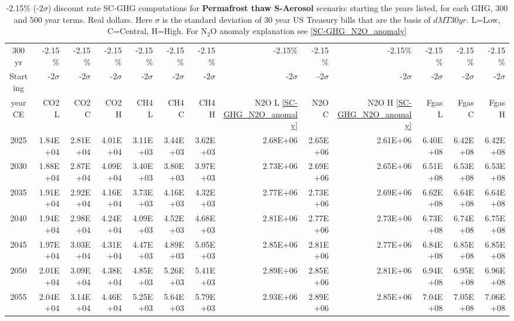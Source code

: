 \documentclass{article}
\begin{document}
\begin{table}
   \caption{-2.15\% (-2$\sigma$) discount rate   SC-GHG computations for \textbf{Permafrost thaw S-Aerosol} scenario: starting the years listed, for each GHG, 300 and 500 year terms. Real dollars. Here $\sigma$ is the standard deviation of 30 year US Treasury bills that are the basis of $dMT30yr$. L=Low, C=Central, H=High. For N$_2$O anomaly explanation see \ref{SC-GHG_N2O_anomaly}} 
\label{PVs_300_yearSCC_SH2.15}
\small
\begin{tabular}{crrr|rrr|rrr|rrr}
300 yr   & -2.15\%    & -2.15\%    & -2.15\%    & -2.15\%    & -2.15\%    & -2.15\%    & -2.15\%    & -2.15\%    & -2.15\%    & -2.15\%    & -2.15\%    & -2.15\%    \\
Starting & -2$\sigma$ & -2$\sigma$ & -2$\sigma$ & -2$\sigma$ & -2$\sigma$ & -2$\sigma$ & -2$\sigma$ & -2$\sigma$ & -2$\sigma$ & -2$\sigma$ & -2$\sigma$ & -2$\sigma$ \\
year CE  & CO2 L      & CO2 C      & CO2 H      & CH4 L      & CH4 C      & CH4 H      & N2O L \ref{SC-GHG_N2O_anomaly}     & N2O C      & N2O H \ref{SC-GHG_N2O_anomaly}      & Fgas L     & Fgas C     & Fgas H     \\
2025     & 1.84E+04   & 2.81E+04   & 4.01E+04   & 3.11E+03   & 3.44E+03   & 3.62E+03   & 2.68E+06   & 2.65E+06   & 2.61E+06   & 6.40E+08   & 6.42E+08   & 6.42E+08   \\
2030     & 1.88E+04   & 2.87E+04   & 4.09E+04   & 3.40E+03   & 3.80E+03   & 3.97E+03   & 2.73E+06   & 2.69E+06   & 2.65E+06   & 6.51E+08   & 6.53E+08   & 6.53E+08   \\
2035     & 1.91E+04   & 2.92E+04   & 4.16E+04   & 3.73E+03   & 4.16E+03   & 4.32E+03   & 2.77E+06   & 2.73E+06   & 2.69E+06   & 6.62E+08   & 6.64E+08   & 6.64E+08   \\
2040     & 1.94E+04   & 2.98E+04   & 4.24E+04   & 4.09E+03   & 4.52E+03   & 4.68E+03   & 2.81E+06   & 2.77E+06   & 2.73E+06   & 6.73E+08   & 6.74E+08   & 6.75E+08   \\
2045     & 1.97E+04   & 3.03E+04   & 4.31E+04   & 4.47E+03   & 4.89E+03   & 5.05E+03   & 2.85E+06   & 2.81E+06   & 2.77E+06   & 6.84E+08   & 6.85E+08   & 6.85E+08   \\
2050     & 2.01E+04   & 3.09E+04   & 4.38E+04   & 4.85E+03   & 5.26E+03   & 5.41E+03   & 2.89E+06   & 2.85E+06   & 2.81E+06   & 6.94E+08   & 6.95E+08   & 6.96E+08   \\
2055     & 2.04E+04   & 3.14E+04   & 4.46E+04   & 5.25E+03   & 5.64E+03   & 5.79E+03   & 2.93E+06   & 2.89E+06   & 2.85E+06   & 7.04E+08   & 7.05E+08   & 7.06E+08   \\

\end{tabular}
\end{table}
\end{document}
